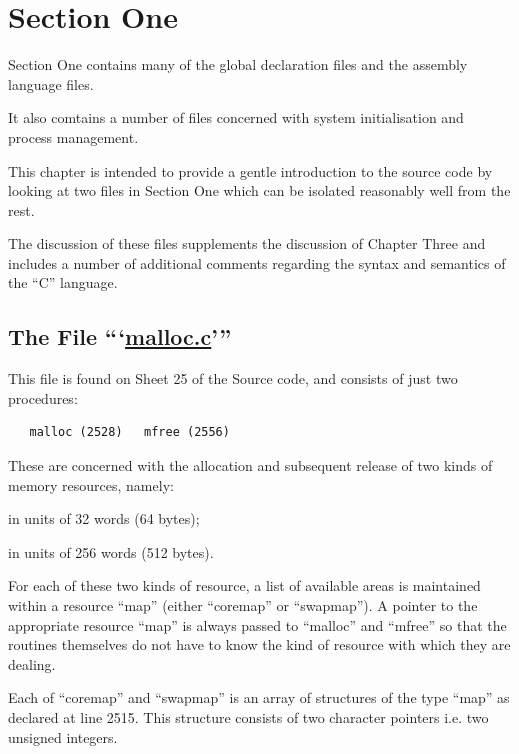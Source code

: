 %
%
\section*{Section One}

{\sf Section One contains many of the global declaration
files and the assembly language files.

It also comtains a number of files concerned with
system initialisation and process management.}



This chapter is intended to provide a
gentle introduction to the source code
by looking at two files in Section One
which can be isolated reasonably well
from the rest.


The discussion of these files supplements the discussion of Chapter Three
and includes a number of additional
comments regarding the syntax and
semantics of the ``C'' language.


\subsection{The File ```\href{./v6/ken/malloc.c}{malloc.c}'''}

This file is found on Sheet 25 of the
Source code, and consists of just two
procedures:

\begin{verbatim}
   malloc (2528)   mfree (2556)
\end{verbatim}


These are concerned with the allocation
and subsequent release of two kinds of
memory resources, namely:

\bd
\item[main memory] in units of 32 words (64 bytes);

\item[disk swap area] in units of 256 words (512 bytes).
\ed

For each of these two kinds of
resource, a list of available areas is
maintained within a resource ``map''
(either ``coremap'' or ``swapmap''). A
pointer to the appropriate resource
``map'' is always passed to ``malloc'' and
``mfree'' so that the routines themselves
do not have to know the kind of
resource with which they are dealing.

Each of ``coremap'' and ``swapmap'' is an
array of structures of the type ``map''
as declared at line 2515. This structure consists of two character pointers
i.e. two unsigned integers.

